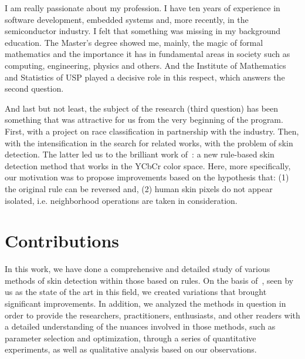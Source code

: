 I am really passionate about my profession. I have ten years of experience in software development, embedded systems and, more recently, in the semiconductor industry. I felt that something was missing in my background education. The Master's degree showed me, mainly, the magic of formal mathematics and the importance it has in fundamental areas in society such as computing, engineering, physics and others. And the Institute of Mathematics and Statistics of USP played a decisive role in this respect, which answers the second question.

And last but not least, the subject of the research (third question) has been something that was attractive for us from the very beginning of the program. First, with a project on race classification in partnership with the industry. Then, with the intensification in the search for related works, with the problem of skin detection. The latter led us to the brilliant work of~\citet{brancati:17}: a new rule-based skin detection method that works in the YCbCr color space. Here, more specifically, our motivation was to propose improvements based on the hypothesis that: (1) the original rule can be reversed and, (2) human skin pixels do not appear isolated, i.e. neighborhood operations are taken in consideration.


\section{Contributions}
\label{sec:contributions}

In this work, we have done a comprehensive and detailed study of various methods of skin detection within those based on rules. On the basis of~\citet{brancati:17}, seen by us as the state of the art in this field, we created variations that brought significant improvements. In addition, we analyzed the methods in question in order to provide the researchers, practitioners, enthusiasts, and other readers with a detailed understanding of the nuances involved in those methods, such as parameter selection and optimization, through a series of quantitative experiments, as well as qualitative analysis based on our observations.

